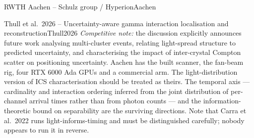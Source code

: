 \begin{programnote}{RWTH Aachen -- Schulz group / Hyperion}{Aachen}
\begin{papernote}{Thull et al.\ 2026 -- Uncertainty-aware gamma interaction localisation and reconstruction}{Thull2026}
\emph{Competitive note:} the discussion explicitly announces future work analysing
multi-cluster events, relating light-spread structure to predicted uncertainty, and
characterising the impact of inter-crystal Compton scatter on positioning uncertainty.
Aachen has the built scanner, the fan-beam rig, four RTX 6000 Ada GPUs and a commercial
arm. The light-distribution version of ICS characterisation should be treated as theirs.
The temporal axis --- cardinality and interaction ordering inferred from the joint
distribution of per-channel arrival times rather than from photon counts --- and the
information-theoretic bound on separability are the surviving directions. Note that
Carra et al.\ 2022 runs light-informs-timing and must be distinguished carefully; nobody
appears to run it in reverse.
\end{papernote}
 
\end{programnote}
 
 
 
